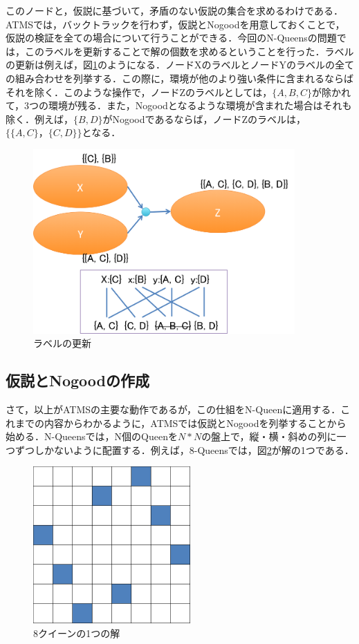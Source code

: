 \documentclass{jarticle}
\begin{document}
このノードと，仮説に基づいて，矛盾のない仮説の集合を求めるわけである．ATMSでは，バックトラックを行わず，仮説とNogoodを用意しておくことで，仮説の検証を全ての場合について行うことができる．今回のN-Queensの問題では，このラベルを更新することで解の個数を求めるということを行った．ラベルの更新は例えば，図\ref{fig:update_label}のようになる．ノードXのラベルとノードYのラベルの全ての組み合わせを列挙する．この際に，環境が他のより強い条件に含まれるならばそれを除く．このような操作で，ノードZのラベルとしては，$\{A, B, C\}$が除かれて，3つの環境が残る．また，Nogoodとなるような環境が含まれた場合はそれも除く．例えば，$\{B, D\}$がNogoodであるならば，ノードZのラベルは，$\{\{A, C\}，\{C, D\}\}$となる．

\begin{figure}[H]
	\begin{center}
	\includegraphics[width=100mm]{image/update_label.png}
	\caption{ラベルの更新}
	\label{fig:update_label}
	\end{center}
\end{figure}





\subsection{仮説とNogoodの作成}

さて，以上がATMSの主要な動作であるが，この仕組をN-Queenに適用する．これまでの内容からわかるように，ATMSでは仮説とNogoodを列挙することから始める．N-Queensでは，N個のQueenを$N*N$の盤上で，縦・横・斜めの列に一つずつしかないように配置する．例えば，8-Queensでは，図\ref{fig:a_sol}が解の1つである．

\begin{figure}[H]
	\begin{center}
	\includegraphics[width=60mm]{image/a_sol.png}
	\caption{8クイーンの1つの解}
	\label{fig:a_sol}
	\end{center}
\end{figure}
\end{document}
